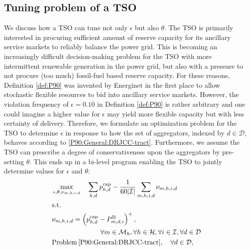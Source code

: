 \documentclass[conference]{IEEEtran}
\begin{document}
\subsection{Tuning problem of a \ac{TSO}}
\vspace{-1mm}
We discuss how a TSO can tune not only $\epsilon$ but also $\theta$. 
The \ac{TSO} is primarily interested in procuring sufficient amount of reserve capacity for its ancillary service markets to reliably balance the power grid. This is becoming an increasingly difficult decision-making problem for the \ac{TSO} with more intermittent renewable generation in the power grid, but also with a pressure to not procure (too much) fossil-fuel based reserve capacity. For these reasons, Definition \ref{def:P90} was invented by Energinet in the first place to allow stochastic flexible resources to bid into ancillary service markets. However, the violation frequency of $\epsilon\!=\!0.10$ in Definition \ref{def:P90} is rather arbitrary and one could imagine a higher value for $\epsilon$ may yield more flexible capacity but with less certainty of delivery. Therefore, we formulate an optimization problem for the \ac{TSO} to determine $\epsilon$ in response to how the set of aggregators, indexed by $d\!\in\!\mathcal{D}$, behaves according to \eqref{P90:General:DRJCC-tract}. Furthermore, we assume the \ac{TSO} can prescribe a degree of conservativeness upon the aggregators by pre-setting $\theta$. This ends up in a bi-level program enabling the TSO to jointly determine values for $\epsilon$ and $\theta$:
%
%
\begin{subequations}\label{P90:TSO}
    \begin{align}
        & \max_{\epsilon, \theta, \nu_{m,h,i,d}} \quad \sum_{h,d} p_{h,d}^{\text{cap}} -  \frac{1}{60|\mathcal{I}|}\sum_{m,h,i,d} \nu_{m,h,i,d}     \label{P90:TSO:outer1}                                                                                                                                                                                                  \\
        & \text{s.t.} \nonumber \\
        & \nu_{m,h,i,d} = \left(p_{h,d}^{\text{cap}} - P_{m,d,i}^{\text{B}} \right)^{+}, \notag\\ &\hspace{2.5cm}\forall{m} \in \mathcal{M}_{h},  \forall{h} \in \mathcal{H}, \forall{i} \in \mathcal{I}, \forall{d} \in \mathcal{D} \label{P90:TSO:outer2}   \\
        & \text{Problem} \thinspace \eqref{P90:General:DRJCC-tract}, \quad \forall{d} \in \mathcal{D}, \label{P90:TSO:inner} 
    \end{align}
\end{subequations}
\end{document}
